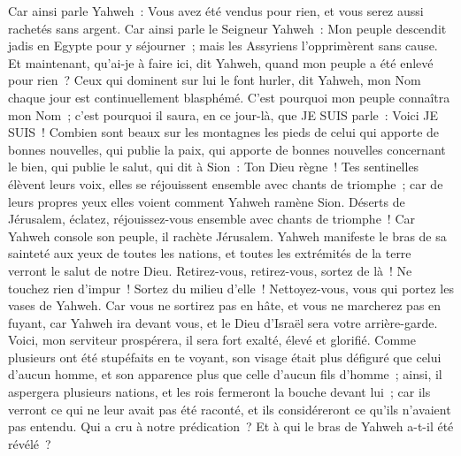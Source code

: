 \begin{multicols}{2}
Car ainsi parle Yahweh~: Vous avez été vendus pour rien, et vous serez aussi rachetés sans argent.
Car ainsi parle le Seigneur Yahweh~: Mon peuple descendit jadis en Egypte pour y séjourner~; mais les Assyriens l'opprimèrent sans cause.
Et maintenant, qu'ai-je à faire ici, dit Yahweh, quand mon peuple a été enlevé pour rien~? Ceux qui dominent sur lui le font hurler, dit Yahweh, mon Nom chaque jour est continuellement blasphémé.
C'est pourquoi mon peuple connaîtra mon Nom~; c'est pourquoi il saura, en ce jour-là, que JE SUIS parle~: Voici JE SUIS~!
Combien sont beaux sur les montagnes les pieds de celui qui apporte de bonnes nouvelles, qui publie la paix, qui apporte de bonnes nouvelles concernant le bien, qui publie le salut, qui dit à Sion~: Ton Dieu règne~!
Tes sentinelles élèvent leurs voix, elles se réjouissent ensemble avec chants de triomphe~; car de leurs propres yeux elles voient comment Yahweh ramène Sion.
Déserts de Jérusalem, éclatez, réjouissez-vous ensemble avec chants de triomphe~! Car Yahweh console son peuple, il rachète Jérusalem.
Yahweh manifeste le bras de sa sainteté aux yeux de toutes les nations, et toutes les extrémités de la terre verront le salut de notre Dieu.
Retirez-vous, retirez-vous, sortez de là~! Ne touchez rien d'impur~! Sortez du milieu d'elle~! Nettoyez-vous, vous qui portez les vases de Yahweh.
Car vous ne sortirez pas en hâte, et vous ne marcherez pas en fuyant, car Yahweh ira devant vous, et le Dieu d'Israël sera votre arrière-garde.
Voici, mon serviteur prospérera, il sera fort exalté, élevé et glorifié.
Comme plusieurs ont été stupéfaits en te voyant, son visage était plus défiguré que celui d'aucun homme, et son apparence plus que celle d'aucun fils d'homme~;
ainsi, il aspergera plusieurs nations, et les rois fermeront la bouche devant lui~; car ils verront ce qui ne leur avait pas été raconté, et ils considéreront ce qu'ils n'avaient pas entendu.
\VerseOne{}Qui a cru à notre prédication~? Et à qui le bras de Yahweh a-t-il été révélé~?

\end{multicols}
